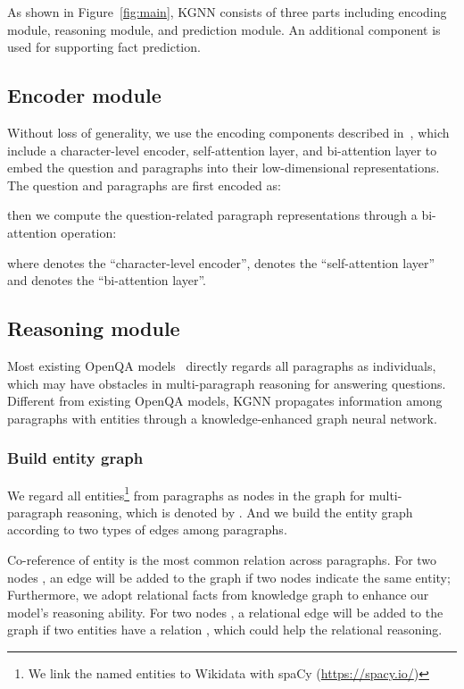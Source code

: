 \documentclass[11pt,a4paper]{article}
\newcommand\OurModel{KGNN\xspace}
\begin{document}
As shown in Figure~\ref{fig:main}, \OurModel consists of three parts including encoding module, reasoning module, and prediction module. An additional component is used for supporting fact prediction.


\subsection{Encoder module}



Without loss of generality, we use the encoding components described in~\citet{clark2017simple}, which include a character-level encoder, self-attention layer, and bi-attention layer to embed the question and paragraphs into their low-dimensional representations. The question  and paragraphs  are first encoded as:

then we compute the question-related paragraph representations through a bi-attention operation:

where  denotes the ``character-level encoder'',  denotes the ``self-attention layer'' and  denotes the ``bi-attention layer''. 


\subsection{Reasoning module}

Most existing OpenQA models~\citep{chen-EtAl:2017:Long4, clark2017simple}  directly regards all paragraphs as individuals, which may have obstacles in multi-paragraph reasoning for answering questions. Different from existing OpenQA models, \OurModel propagates information among paragraphs with entities through a knowledge-enhanced graph neural network.

\subsubsection{Build entity graph}

We regard all entities\footnote{We link the named entities to Wikidata with spaCy (\url{https://spacy.io/})} from paragraphs as nodes in the graph for multi-paragraph reasoning, which is denoted by . And we build the entity graph according to two types of edges among paragraphs.



Co-reference of entity is the most common relation across paragraphs. For two nodes , an edge  will be added to the graph if two nodes indicate the same entity; Furthermore, we adopt relational facts from knowledge graph to enhance our model's reasoning ability. For two nodes , a relational edge  will be added to the graph if two entities have a relation , which could help the relational reasoning.
\end{document}
